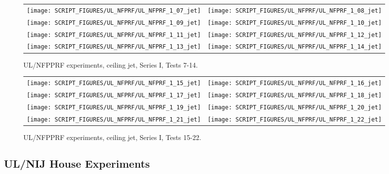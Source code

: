 \newpage

\begin{figure}[p]
\begin{tabular*}{\textwidth}{l@{\extracolsep{\fill}}r}
\texttt{[image: SCRIPT\_FIGURES/UL\_NFPRF/UL\_NFPRF\_1\_07\_jet]} &
\texttt{[image: SCRIPT\_FIGURES/UL\_NFPRF/UL\_NFPRF\_1\_08\_jet]} \\
\texttt{[image: SCRIPT\_FIGURES/UL\_NFPRF/UL\_NFPRF\_1\_09\_jet]} &
\texttt{[image: SCRIPT\_FIGURES/UL\_NFPRF/UL\_NFPRF\_1\_10\_jet]} \\
\texttt{[image: SCRIPT\_FIGURES/UL\_NFPRF/UL\_NFPRF\_1\_11\_jet]} &
\texttt{[image: SCRIPT\_FIGURES/UL\_NFPRF/UL\_NFPRF\_1\_12\_jet]} \\
\texttt{[image: SCRIPT\_FIGURES/UL\_NFPRF/UL\_NFPRF\_1\_13\_jet]} &
\texttt{[image: SCRIPT\_FIGURES/UL\_NFPRF/UL\_NFPRF\_1\_14\_jet]}
\end{tabular*}
\caption{UL/NFPPRF experiments, ceiling jet, Series I, Tests 7-14.}
\label{UL_NFPRF_jet_2}
\end{figure}

\begin{figure}[p]
\begin{tabular*}{\textwidth}{l@{\extracolsep{\fill}}r}
\texttt{[image: SCRIPT\_FIGURES/UL\_NFPRF/UL\_NFPRF\_1\_15\_jet]} &
\texttt{[image: SCRIPT\_FIGURES/UL\_NFPRF/UL\_NFPRF\_1\_16\_jet]} \\
\texttt{[image: SCRIPT\_FIGURES/UL\_NFPRF/UL\_NFPRF\_1\_17\_jet]} &
\texttt{[image: SCRIPT\_FIGURES/UL\_NFPRF/UL\_NFPRF\_1\_18\_jet]} \\
\texttt{[image: SCRIPT\_FIGURES/UL\_NFPRF/UL\_NFPRF\_1\_19\_jet]} &
\texttt{[image: SCRIPT\_FIGURES/UL\_NFPRF/UL\_NFPRF\_1\_20\_jet]} \\
\texttt{[image: SCRIPT\_FIGURES/UL\_NFPRF/UL\_NFPRF\_1\_21\_jet]} &
\texttt{[image: SCRIPT\_FIGURES/UL\_NFPRF/UL\_NFPRF\_1\_22\_jet]}
\end{tabular*}
\caption{UL/NFPPRF experiments, ceiling jet, Series I, Tests 15-22.}
\label{UL_NFPRF_jet_3}
\end{figure}


\clearpage

\subsection{UL/NIJ House Experiments}

